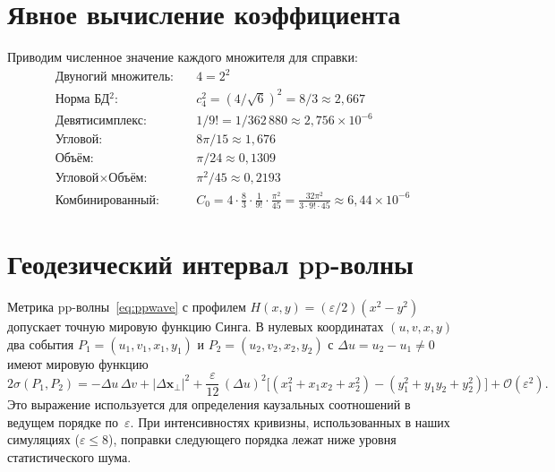 \documentclass[12pt,a4paper]{article}
\theoremstyle{plain}
\theoremstyle{definition}
\theoremstyle{remark}
\newcommand{\order}{\mathcal{O}}
\begin{document}
\appendix

\section{Явное вычисление коэффициента}
\label{app:coefficient}

Приводим численное значение каждого множителя для справки:
\begin{align}
  \text{Двуногий множитель:} \quad & 4 = 2^2 \\
  \text{Норма БД}{}^2\text{:} \quad & c_4^2 = (4/\sqrt{6})^2 = 8/3
  \approx 2{,}667 \\
  \text{Девятисимплекс:} \quad & 1/9! = 1/362\,880
  \approx 2{,}756 \times 10^{-6} \\
  \text{Угловой:} \quad & 8\pi/15 \approx 1{,}676 \\
  \text{Объём:} \quad & \pi/24 \approx 0{,}1309 \\
  \text{Угловой} \times \text{Объём:} \quad
  & \pi^2/45 \approx 0{,}2193 \\
  \text{Комбинированный:} \quad
  & C_0 = 4 \cdot \frac{8}{3} \cdot \frac{1}{9!}
    \cdot \frac{\pi^2}{45}
  = \frac{32\pi^2}{3 \cdot 9! \cdot 45}
  \approx 6{,}44 \times 10^{-6}
\end{align}

\section{Геодезический интервал pp-волны}
\label{app:ppwave}

Метрика pp-волны~\eqref{eq:ppwave} с профилем
$H(x,y) = (\varepsilon/2)(x^2 - y^2)$ допускает точную
мировую функцию Синга.  В нулевых координатах
$(u, v, x, y)$ два события
$P_1 = (u_1, v_1, x_1, y_1)$ и
$P_2 = (u_2, v_2, x_2, y_2)$ с $\Delta u = u_2 - u_1 \neq 0$
имеют мировую функцию
\begin{equation}\label{eq:synge}
  2\sigma(P_1, P_2) = -\Delta u\, \Delta v
  + |\Delta \mathbf{x}_\perp|^2
  + \frac{\varepsilon}{12}\,(\Delta u)^2
    \bigl[(x_1^2 + x_1 x_2 + x_2^2) - (y_1^2 + y_1 y_2 + y_2^2)\bigr]
  + \order(\varepsilon^2).
\end{equation}
Это выражение используется для определения каузальных
соотношений в ведущем порядке по~$\varepsilon$.  При
интенсивностях кривизны, использованных в наших симуляциях
($\varepsilon \leq 8$), поправки следующего порядка лежат
ниже уровня статистического шума.
\end{document}
